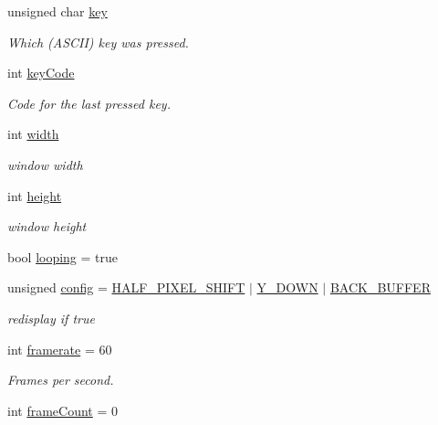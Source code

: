 \begin{DoxyCompactItemize}
unsigned char \hyperlink{namespacecprocessing_a8943a4676a0d064d844b15fc85d5893c}{key}
\begin{DoxyCompactList}\small\item\em \-Which (\-A\-S\-C\-I\-I) key was pressed. \end{DoxyCompactList}\item 
int \hyperlink{namespacecprocessing_acbef3b8ea033c7882b342ca95663df13}{key\-Code}
\begin{DoxyCompactList}\small\item\em \-Code for the last pressed key. \end{DoxyCompactList}\item 
int \hyperlink{namespacecprocessing_a7af937eb8772235def57fcadd10fc82a}{width}
\begin{DoxyCompactList}\small\item\em window width \end{DoxyCompactList}\item 
int \hyperlink{namespacecprocessing_ac392753eef02e2ad4ad84f5a076919be}{height}
\begin{DoxyCompactList}\small\item\em window height \end{DoxyCompactList}\item 
bool \hyperlink{namespacecprocessing_adb31b652ffe4e5d37d118050f97e9c3c}{looping} = true
\item 
unsigned \hyperlink{namespacecprocessing_aaf948cc5fb7d936d5842b88e13112ffe}{config} = \hyperlink{namespacecprocessing_a8478adf68ba4c46fd83db0ce170e2bd7a09931e65f1593a3d50fae52dc558a7d8}{\-H\-A\-L\-F\-\_\-\-P\-I\-X\-E\-L\-\_\-\-S\-H\-I\-F\-T} $|$ \hyperlink{namespacecprocessing_a8478adf68ba4c46fd83db0ce170e2bd7a811abeaa00dcfe9b93bb925727d49c24}{\-Y\-\_\-\-D\-O\-W\-N} $|$ \hyperlink{namespacecprocessing_a8478adf68ba4c46fd83db0ce170e2bd7a2819ac0826f666da0c6a3e484011f38e}{\-B\-A\-C\-K\-\_\-\-B\-U\-F\-F\-E\-R}
\begin{DoxyCompactList}\small\item\em redisplay if true \end{DoxyCompactList}\item 
int \hyperlink{namespacecprocessing_a7d27ffd61ab47bccc92ab035094e69ee}{framerate} = 60
\begin{DoxyCompactList}\small\item\em \-Frames per second. \end{DoxyCompactList}\item 
int \hyperlink{namespacecprocessing_aca5f2a565e0aca50db1f6d5aa4a4b33d}{frame\-Count} = 0

\end{DoxyCompactItemize}
